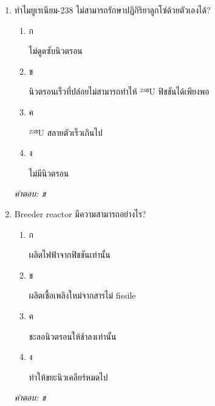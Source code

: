 \documentclass[12pt]{article}
\begin{document}
\begin{enumerate}[label=\arabic*., itemsep=0.5\baselineskip, topsep=0.5\baselineskip, leftmargin=*]
\item ทำไมยูเรเนียม-238 ไม่สามารถรักษาปฏิกิริยาลูกโซ่ด้วยตัวเองได้?
\begin{enumerate}[label=\alph*)., itemsep=0.3\baselineskip, topsep=0.3\baselineskip]
\item ก\ 
\begin{minipage}[t]{0.9\linewidth}
\raggedright ไม่ดูดซับนิวตรอน
\end{minipage}
\item ข\ 
\begin{minipage}[t]{0.9\linewidth}
\raggedright นิวตรอนเร็วที่ปล่อยไม่สามารถทำให้ ²³⁸U ฟิชชันได้เพียงพอ
\end{minipage}
\item ค\ 
\begin{minipage}[t]{0.9\linewidth}
\raggedright ²³⁸U สลายตัวเร็วเกินไป
\end{minipage}
\item ง\ 
\begin{minipage}[t]{0.9\linewidth}
\raggedright ไม่มีนิวตรอน
\end{minipage}
\end{enumerate}
\vspace{-0.3\baselineskip}
\begin{small}
\textit{คำตอบ: ข}
\end{small}

\item Breeder reactor มีความสามารถอย่างไร?
\begin{enumerate}[label=\alph*)., itemsep=0.3\baselineskip, topsep=0.3\baselineskip]
\item ก\ 
\begin{minipage}[t]{0.9\linewidth}
\raggedright ผลิตไฟฟ้าจากฟิชชันเท่านั้น
\end{minipage}
\item ข\ 
\begin{minipage}[t]{0.9\linewidth}
\raggedright ผลิตเชื้อเพลิงใหม่จากสารไม่ fissile
\end{minipage}
\item ค\ 
\begin{minipage}[t]{0.9\linewidth}
\raggedright ชะลอนิวตรอนให้ช้าลงเท่านั้น
\end{minipage}
\item ง\ 
\begin{minipage}[t]{0.9\linewidth}
\raggedright ทำให้ขยะนิวเคลียร์หมดไป
\end{minipage}
\end{enumerate}
\vspace{-0.3\baselineskip}
\begin{small}
\textit{คำตอบ: ข}
\end{small}


\end{enumerate}
\end{document}
